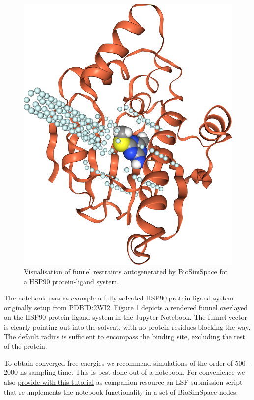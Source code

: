 \begin{figure}[htp]
\includegraphics[width=\linewidth]{LIVECOMS/02_funnel_metad/funmetad-hsp90.png}
\caption{Visualisation of funnel restraints autogenerated by BioSimSpace for a HSP90 protein-ligand system.}
\label{fig:fun-hsp90}
\end{figure}

The notebook uses as example a fully solvated HSP90 protein-ligand system originally setup from PDBID:2WI2. 
Figure \ref{fig:fun-hsp90} depicts a rendered funnel overlayed on the HSP90 protein-ligand system in the Jupyter Notebook. The funnel vector is clearly pointing out into the solvent, with no protein residues blocking the way. The default radius is sufficient to encompass the binding site, excluding the rest of the protein.


To obtain converged free energies we recommend simulations of the order of 500 - 2000 ns sampling time. This is best done out of a notebook. For convenience we also \href{https://github.com/OpenBioSim/biosimspace_tutorials/tree/main/02_funnel_metad/example_nodes}{provide with this tutorial} as companion resource an LSF submission script that re-implements the notebook functionality in a set of BioSimSpace nodes.  

